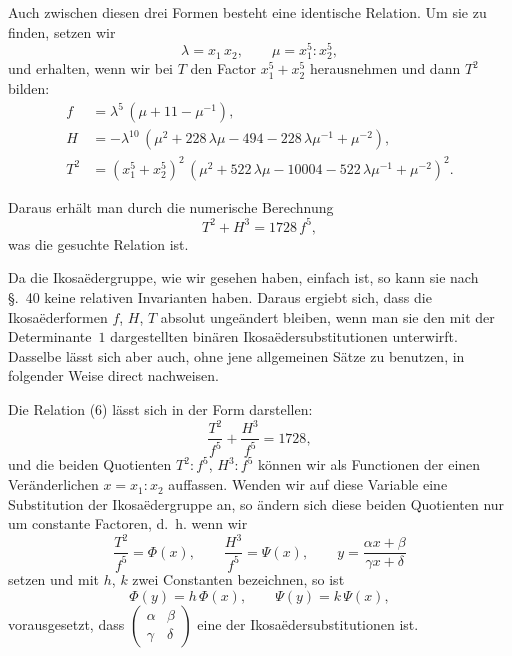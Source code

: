 \documentclass[12pt,a4paper]{article}
\theoremstyle{plain}
\theoremstyle{definition}
\theoremstyle{remark}
\begin{document}
Auch zwischen diesen drei Formen besteht eine identische Relation. Um sie zu finden, setzen wir
\[
\lambda = x_{1}\,x_{2},\qquad \mu = x_{1}^{5} : x_{2}^{5},
\]
und erhalten, wenn wir bei $T$ den Factor $x_{1}^{5} + x_{2}^{5}$ herausnehmen und dann $T^{2}$ bilden:
\[
\begin{aligned}
f &= \lambda^{5}\,(\mu + 11 - \mu^{-1}), \\
H &= -\lambda^{10}\,(\mu^{2} + 228\,\lambda\mu - 494 - 228\,\lambda\mu^{-1} + \mu^{-2}), \\
T^{2} &= (x_{1}^{5} + x_{2}^{5})^{2}\,(\mu^{2} + 522\,\lambda\mu - 10004 - 522\,\lambda\mu^{-1} + \mu^{-2})^{2}.
\end{aligned}
\]

Daraus erh\"alt man durch die numerische Berechnung
\begin{equation}\tag{6}
T^{2} + H^{3} = 1728\,f^{5},
\end{equation}
was die gesuchte Relation ist.

Da die Ikosa\"edergruppe, wie wir gesehen haben, einfach ist, so kann sie nach \S.~40 keine relativen Invarianten haben. Daraus ergiebt sich, dass die Ikosa\"ederformen $f$, $H$, $T$ absolut unge\"andert bleiben, wenn man sie den mit der Determinante~$1$ dargestellten bin\"aren Ikosa\"edersubstitutionen unterwirft. Dasselbe l\"asst sich aber auch, ohne jene allgemeinen S\"atze zu benutzen, in folgender Weise direct nachweisen.

Die Relation (6) l\"asst sich in der Form darstellen:
\begin{equation}\tag{7}
\frac{T^{2}}{f^{5}} + \frac{H^{3}}{f^{5}} = 1728,
\end{equation}
und die beiden Quotienten $T^{2}:f^{5}$, $H^{3}:f^{5}$ k\"onnen wir als Functionen der einen Ver\"anderlichen $x = x_{1} : x_{2}$ auffassen. Wenden wir auf diese Variable eine Substitution der Ikosa\"edergruppe an, so \"andern sich diese beiden Quotienten nur um constante Factoren, d.~h. wenn wir
\begin{equation}\tag{8}
\frac{T^{2}}{f^{5}} = \Phi(x),\qquad \frac{H^{3}}{f^{5}} = \Psi(x),\qquad y = \frac{\alpha x + \beta}{\gamma x + \delta}
\end{equation}
setzen und mit $h$, $k$ zwei Constanten bezeichnen, so ist
\[
\Phi(y) = h\,\Phi(x),\qquad \Psi(y) = k\,\Psi(x),
\]
vorausgesetzt, dass $\begin{pmatrix}\alpha & \beta \\ \gamma & \delta\end{pmatrix}$ eine der Ikosa\"edersubstitutionen ist.
\end{document}
